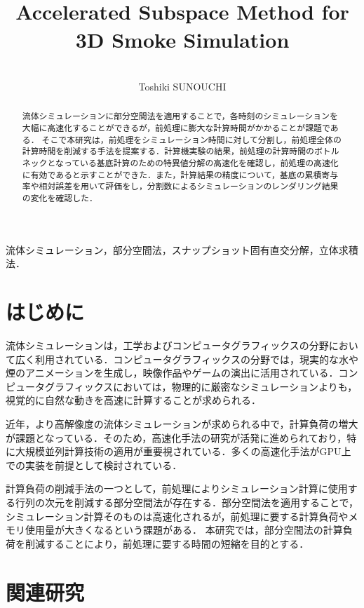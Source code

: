 \documentclass[uplatex,dvipdfmx,10pt,a4paper,notitlepage,oneside,twocolumn]{abst_jsarticle}
\title{
\textbf{\textgt{煙シミュレーションのための部分空間法の高速化}}\\
\textsf{Accelerated Subspace Method for 3D Smoke Simulation}\\
}
\author{
{\large \textbf{\textgt{情報工学専攻　須之内　俊樹}}}\\
{\large \textsf{Toshiki SUNOUCHI}}
}
\date{}
\begin{document}
\maketitle
\thispagestyle{firstpage}

\begin{abstract}
流体シミュレーションに部分空間法を適用することで，各時刻のシミュレーションを大幅に高速化することができるが，前処理に膨大な計算時間がかかることが課題である．
そこで本研究は，前処理をシミュレーション時間に対して分割し，前処理全体の計算時間を削減する手法を提案する．計算機実験の結果，前処理の計算時間のボトルネックとなっている基底計算のための特異値分解の高速化を確認し，前処理の高速化に有効であると示すことができた．また，計算結果の精度について，基底の累積寄与率や相対誤差を用いて評価をし，分割数によるシミュレーションのレンダリング結果の変化を確認した．
\end{abstract}


\vspace{1zw} \noindent
\textbf{} 
流体シミュレーション，部分空間法，スナップショット固有直交分解，立体求積法．

\section{はじめに} \label{sec:section1}

流体シミュレーションは，工学およびコンピュータグラフィックスの分野において広く利用されている．コンピュータグラフィックスの分野では，現実的な水や煙のアニメーションを生成し，映像作品やゲームの演出に活用されている．コンピュータグラフィックスにおいては，物理的に厳密なシミュレーションよりも，視覚的に自然な動きを高速に計算することが求められる．

近年，より高解像度の流体シミュレーションが求められる中で，計算負荷の増大が課題となっている．そのため，高速化手法の研究が活発に進められており，特に大規模並列計算技術の適用が重要視されている．多くの高速化手法がGPU上での実装を前提として検討されている．

計算負荷の削減手法の一つとして，前処理によりシミュレーション計算に使用する行列の次元を削減する部分空間法が存在する．部分空間法を適用することで，シミュレーション計算そのものは高速化されるが，前処理に要する計算負荷やメモリ使用量が大きくなるという課題がある．
本研究では，部分空間法の計算負荷を削減することにより，前処理に要する時間の短縮を目的とする．

\section{関連研究}
\end{document}
